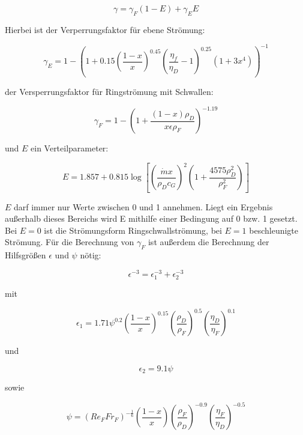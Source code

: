 \begin{equation}
\gamma = \gamma_F(1-E) + \gamma_E E
\end{equation}

Hierbei ist der Verperrungsfaktor für ebene Strömung:

\begin{equation}
\gamma_E = 1 - \left( 1+0.15 \left( \frac{1-x}{x} \right)^{0.45} \left( \frac{\eta_f}{\eta_D}-1 \right)^{0.25} (1 + 3x^4)\right)^{-1}
\end{equation}

der Versperrungsfaktor für Ringströmung mit Schwallen:

\begin{equation}
\gamma_F = 1 - \left(1+\frac{(1-x)\rho_D}{x \epsilon \rho_F}\right)^{-1.19}
\end{equation}


und $E$ ein Verteilparameter:

\begin{equation}
E = 1.857 + 0.815 \log\left[\left(\frac{\dot{m} x}{\rho_D c_G}\right)^2 \left( 1+ \frac{4575 \rho_D^2}{\rho_F^2} \right)\right]
\end{equation}

$E$ darf immer nur Werte zwischen 0 und 1 annehmen. Liegt ein Ergebnis außerhalb dieses Bereichs wird E mithilfe einer Bedingung auf 0 bzw. 1 gesetzt. Bei $E=0$ ist die Strömungsform Ringschwallströmung, bei $E=1$ beschleunigte Strömung.
Für die Berechnung von $\gamma_F$ ist außerdem die Berechnung der Hilfsgrößen $\epsilon$ und $\psi$ nötig:

\begin{equation}
\epsilon^{-3} = \epsilon_1^{-3} + \epsilon_2^{-3}
\end{equation}

mit

\begin{equation}
\epsilon_1 = 1.71 \psi^{0.2} \left( \frac{1-x}{x} \right)^{0.15} \left( \frac{\rho_D}{\rho_F} \right)^{0.5} \left( \frac{\eta_D}{\eta_F} \right)^{0.1}
\end{equation}

und

\begin{equation}
\epsilon_2 = 9.1 \psi
\end{equation}

sowie

\begin{equation}
\psi = (Re_F Fr_F)^{-\frac{1}{6}} \left( \frac{1-x}{x} \right) \left(\frac{\rho_F}{\rho_D} \right)^{-0.9} \left(\frac{\eta_F}{\eta_D} \right)^{-0.5}
\end{equation}

